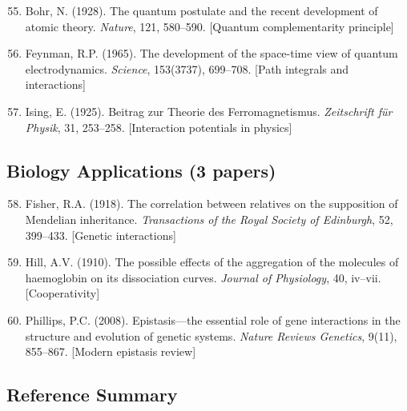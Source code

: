 \begin{enumerate}
    \setcounter{enumi}{54}
    \item Bohr, N. (1928). The quantum postulate and the recent development of atomic theory. \textit{Nature}, 121, 580--590. [Quantum complementarity principle]

    \item Feynman, R.P. (1965). The development of the space-time view of quantum electrodynamics. \textit{Science}, 153(3737), 699--708. [Path integrals and interactions]

    \item Ising, E. (1925). Beitrag zur Theorie des Ferromagnetismus. \textit{Zeitschrift für Physik}, 31, 253--258. [Interaction potentials in physics]
\end{enumerate}

\subsection{Biology Applications (3 papers)}

\begin{enumerate}
    \setcounter{enumi}{57}
    \item Fisher, R.A. (1918). The correlation between relatives on the supposition of Mendelian inheritance. \textit{Transactions of the Royal Society of Edinburgh}, 52, 399--433. [Genetic interactions]

    \item Hill, A.V. (1910). The possible effects of the aggregation of the molecules of haemoglobin on its dissociation curves. \textit{Journal of Physiology}, 40, iv--vii. [Cooperativity]

    \item Phillips, P.C. (2008). Epistasis—the essential role of gene interactions in the structure and evolution of genetic systems. \textit{Nature Reviews Genetics}, 9(11), 855--867. [Modern epistasis review]
\end{enumerate}

\subsection{Reference Summary}

